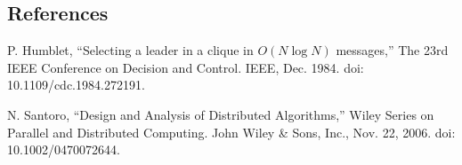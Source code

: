 \documentclass[a4paper,12pt]{article}
\begin{document}
\subsection*{References}

P. Humblet, ``Selecting a leader in a clique in $O(N \log N)$ messages,''
The 23rd IEEE Conference on Decision and Control. IEEE, Dec. 1984. doi: 10.1109/cdc.1984.272191.

N. Santoro, ``Design and Analysis of Distributed Algorithms,''
Wiley Series on Parallel and Distributed Computing. John Wiley \& Sons, Inc., Nov. 22, 2006. doi: 10.1002/0470072644.
\end{document}
